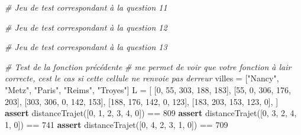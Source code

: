 \documentclass[
  paper=a4,
  ,captions=tableheading
]{scrartcl}
\newenvironment{Shaded}{}{}
\newcommand{\CommentTok}[1]{\textcolor[rgb]{0.38,0.63,0.69}{\textit{#1}}}
\newcommand{\ControlFlowTok}[1]{\textcolor[rgb]{0.00,0.44,0.13}{\textbf{#1}}}
\newcommand{\DecValTok}[1]{\textcolor[rgb]{0.25,0.63,0.44}{#1}}
\newcommand{\NormalTok}[1]{#1}
\newcommand{\OperatorTok}[1]{\textcolor[rgb]{0.40,0.40,0.40}{#1}}
\newcommand{\StringTok}[1]{\textcolor[rgb]{0.25,0.44,0.63}{#1}}
\begin{document}
\begin{Shaded}
\begin{Highlighting}[]
\CommentTok{\# Jeu de test correspondant à la question 11}
\end{Highlighting}
\end{Shaded}

\begin{Shaded}
\begin{Highlighting}[]
\CommentTok{\# Jeu de test correspondant à la question 12}
\end{Highlighting}
\end{Shaded}

\begin{Shaded}
\begin{Highlighting}[]
\CommentTok{\# Jeu de test correspondant à la question 13}
\end{Highlighting}
\end{Shaded}

\begin{Shaded}
\begin{Highlighting}[]
\CommentTok{\# Test de la fonction précédente}
\CommentTok{\# me permet de voir que votre fonction à l\textquotesingle{}air correcte, c\textquotesingle{}est le cas si cette cellule ne renvoie pas d\textquotesingle{}erreur}
\NormalTok{villes }\OperatorTok{=}\NormalTok{ [}\StringTok{"Nancy"}\NormalTok{, }\StringTok{"Metz"}\NormalTok{, }\StringTok{"Paris"}\NormalTok{, }\StringTok{"Reims"}\NormalTok{, }\StringTok{"Troyes"}\NormalTok{]}
\NormalTok{L }\OperatorTok{=}\NormalTok{ [}
\NormalTok{    [}\DecValTok{0}\NormalTok{, }\DecValTok{55}\NormalTok{, }\DecValTok{303}\NormalTok{, }\DecValTok{188}\NormalTok{, }\DecValTok{183}\NormalTok{],}
\NormalTok{    [}\DecValTok{55}\NormalTok{, }\DecValTok{0}\NormalTok{, }\DecValTok{306}\NormalTok{, }\DecValTok{176}\NormalTok{, }\DecValTok{203}\NormalTok{],}
\NormalTok{    [}\DecValTok{303}\NormalTok{, }\DecValTok{306}\NormalTok{, }\DecValTok{0}\NormalTok{, }\DecValTok{142}\NormalTok{, }\DecValTok{153}\NormalTok{],}
\NormalTok{    [}\DecValTok{188}\NormalTok{, }\DecValTok{176}\NormalTok{, }\DecValTok{142}\NormalTok{, }\DecValTok{0}\NormalTok{, }\DecValTok{123}\NormalTok{],}
\NormalTok{    [}\DecValTok{183}\NormalTok{, }\DecValTok{203}\NormalTok{, }\DecValTok{153}\NormalTok{, }\DecValTok{123}\NormalTok{, }\DecValTok{0}\NormalTok{],}
\NormalTok{]}
\ControlFlowTok{assert}\NormalTok{ distanceTrajet([}\DecValTok{0}\NormalTok{, }\DecValTok{1}\NormalTok{, }\DecValTok{2}\NormalTok{, }\DecValTok{3}\NormalTok{, }\DecValTok{4}\NormalTok{, }\DecValTok{0}\NormalTok{]) }\OperatorTok{==} \DecValTok{809}
\ControlFlowTok{assert}\NormalTok{ distanceTrajet([}\DecValTok{0}\NormalTok{, }\DecValTok{3}\NormalTok{, }\DecValTok{2}\NormalTok{, }\DecValTok{4}\NormalTok{, }\DecValTok{1}\NormalTok{, }\DecValTok{0}\NormalTok{]) }\OperatorTok{==} \DecValTok{741}
\ControlFlowTok{assert}\NormalTok{ distanceTrajet([}\DecValTok{0}\NormalTok{, }\DecValTok{4}\NormalTok{, }\DecValTok{2}\NormalTok{, }\DecValTok{3}\NormalTok{, }\DecValTok{1}\NormalTok{, }\DecValTok{0}\NormalTok{]) }\OperatorTok{==} \DecValTok{709}
\end{Highlighting}
\end{Shaded}
\end{document}
